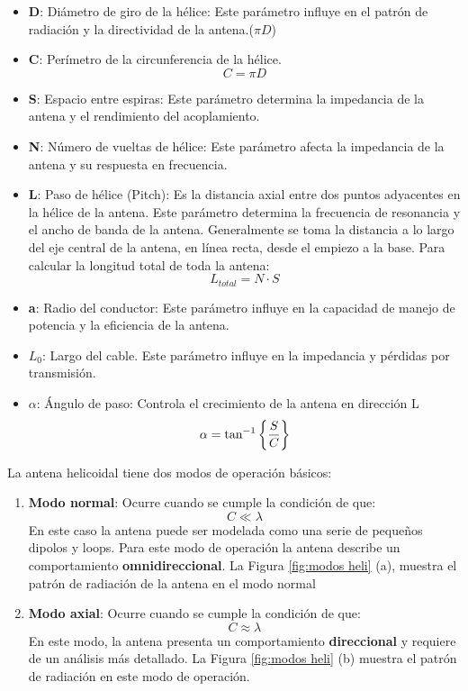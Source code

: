 \documentclass[
	12pt, %
	fleqn, %
	a4paper, %
	oneside, %
]{LegrandOrangeBook}
\begin{document}
\begin{itemize}
\item \textbf{D}: Diámetro de giro de la hélice: Este parámetro influye en el patrón de radiación y la directividad de la antena.($\pi D$)
\item \textbf{C}: Perímetro de la circunferencia de la hélice.
\begin{equation}
C=\pi D
\end{equation}
\item \textbf{S}: Espacio entre espiras: Este parámetro determina la impedancia de la antena y el rendimiento del acoplamiento.
\item \textbf{N}: Número de vueltas de hélice: Este parámetro afecta la impedancia de la antena y su respuesta en frecuencia.
\item \textbf{L}: Paso de hélice (Pitch): Es la distancia axial entre dos puntos adyacentes en la hélice de la antena. Este parámetro determina la frecuencia de resonancia y el ancho de banda de la antena. Generalmente se toma la distancia a lo largo del eje central de la antena, en línea recta, desde el empiezo a la base. Para calcular la longitud total de toda la antena:
\begin{equation}
L_{total}=N\cdot S
\end{equation}
\item \textbf{a}: Radio del conductor: Este parámetro influye en la capacidad de manejo de potencia y la eficiencia de la antena.
\item \textbf{$L_0$}: Largo del cable. Este parámetro influye en la impedancia y pérdidas por transmisión.
\item \textbf{$\alpha$}: Ángulo de paso: Controla el crecimiento de la antena en dirección L
\begin{equation}
\alpha=\tan^{-1}\left\lbrace \frac{S}{C}\right\rbrace
\end{equation}
\end{itemize}
La antena helicoidal tiene dos modos de operación básicos:
\begin{enumerate}
\item \textbf{Modo normal}: Ocurre cuando se cumple la condición de que:
\begin{equation}
C\ll\lambda
\end{equation}
En este caso la antena puede ser modelada como una serie de pequeños dipolos y loops. Para este modo de operación la antena describe un comportamiento \textbf{omnidireccional}. La Figura \ref{fig:modos heli} (a), muestra el patrón de radiación de la antena en el modo normal
\item \textbf{Modo axial}: Ocurre cuando se cumple la condición de que:
\begin{displaymath}
C\approx\lambda
\end{displaymath}
En este modo, la antena presenta un comportamiento \textbf{direccional} y requiere de un análisis más detallado. La Figura \ref{fig:modos heli} (b) muestra el patrón de radiación en este modo de operación.
\end{enumerate}
\end{document}
